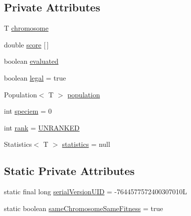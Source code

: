 \subsection*{Private Attributes}
\begin{DoxyCompactItemize}
\item 
T \hyperlink{classjenes_1_1population_1_1_individual_3_01_t_01extends_01_chromosome_01_4_ab83da09312b8d5c807d6e6d04692e1a4}{chromosome}
\item 
double \hyperlink{classjenes_1_1population_1_1_individual_3_01_t_01extends_01_chromosome_01_4_a1abd72838faa3246dbf498f66ed7963a}{score} \mbox{[}$\,$\mbox{]}
\item 
boolean \hyperlink{classjenes_1_1population_1_1_individual_3_01_t_01extends_01_chromosome_01_4_a10205aa0bc5a6fd766df166027396a78}{evaluated}
\item 
boolean \hyperlink{classjenes_1_1population_1_1_individual_3_01_t_01extends_01_chromosome_01_4_a0775108a26a06ac9d9fe4aea63bd5709}{legal} = true
\item 
Population$<$ T $>$ \hyperlink{classjenes_1_1population_1_1_individual_3_01_t_01extends_01_chromosome_01_4_a6a4149139b12672baab0d9d65cdeffb2}{population}
\item 
int \hyperlink{classjenes_1_1population_1_1_individual_3_01_t_01extends_01_chromosome_01_4_a8f5c7ae0c537b3f59be861f78d0bdf1b}{speciem} = 0
\item 
int \hyperlink{classjenes_1_1population_1_1_individual_3_01_t_01extends_01_chromosome_01_4_a393116ea0dc6238686c67292f5f8a9ca}{rank} = \hyperlink{classjenes_1_1population_1_1_individual_3_01_t_01extends_01_chromosome_01_4_a6f913202241aa5f7255e482179175f62}{U\-N\-R\-A\-N\-K\-E\-D}
\item 
Statistics$<$ T $>$ \hyperlink{classjenes_1_1population_1_1_individual_3_01_t_01extends_01_chromosome_01_4_ada4319553581f0d52b9623a0f434daad}{statistics} = null
\end{DoxyCompactItemize}
\subsection*{Static Private Attributes}
\begin{DoxyCompactItemize}
\item 
static final long \hyperlink{classjenes_1_1population_1_1_individual_3_01_t_01extends_01_chromosome_01_4_a4479bb5b4c3aa508f88f06585fa78be1}{serial\-Version\-U\-I\-D} = -\/7644577572400307010\-L
\item 
static boolean \hyperlink{classjenes_1_1population_1_1_individual_3_01_t_01extends_01_chromosome_01_4_a76c4bb153b0ed0eb30b9cf1faa376c20}{same\-Chromosome\-Same\-Fitness} = true
\end{DoxyCompactItemize}



